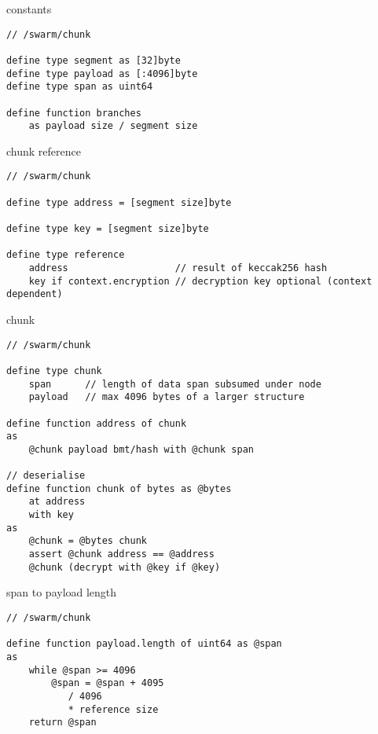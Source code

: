 

\begin{definition}{constants}\label{def:chunk-constants}
\begin{lstlisting}[language=buzz1]
// /swarm/chunk

define type segment as [32]byte
define type payload as [:4096]byte 
define type span as uint64 

define function branches 
    as payload size / segment size

\end{lstlisting}
\end{definition}

\begin{definition}{chunk reference}\label{def:chunk-reference}
\begin{lstlisting}[language=buzz1]
// /swarm/chunk

define type address = [segment size]byte

define type key = [segment size]byte 

define type reference 
    address                   // result of keccak256 hash
    key if context.encryption // decryption key optional (context dependent)

\end{lstlisting}
\end{definition}


\begin{definition}{chunk}\label{def:chunks}
\begin{lstlisting}[language=buzz1]
// /swarm/chunk

define type chunk
    span      // length of data span subsumed under node
    payload   // max 4096 bytes of a larger structure

define function address of chunk
as
    @chunk payload bmt/hash with @chunk span 

// deserialise 
define function chunk of bytes as @bytes
    at address
    with key
as  
    @chunk = @bytes chunk 
    assert @chunk address == @address
    @chunk (decrypt with @key if @key)

\end{lstlisting}
\end{definition}

\begin{definition}{span to payload length}\label{def:span}
\begin{lstlisting}[language=buzz1]
// /swarm/chunk

define function payload.length of uint64 as @span
as
    while @span >= 4096 
        @span = @span + 4095
           / 4096
           * reference size
    return @span
\end{lstlisting}
\end{definition}

